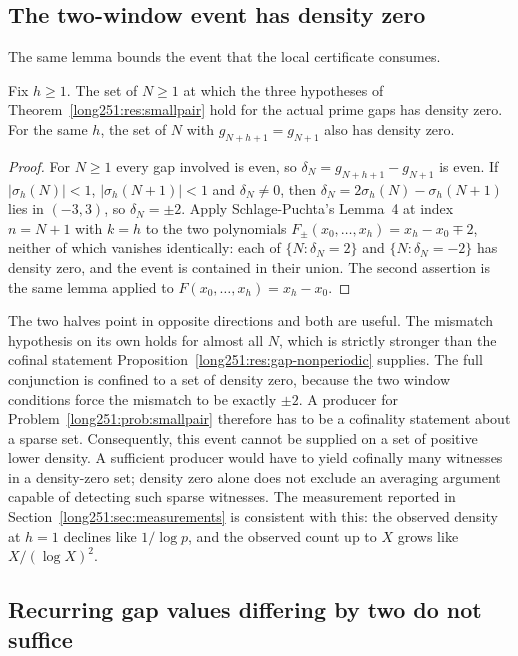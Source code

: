 \documentclass[11pt]{article}
\begin{document}
\subsection{The two-window event has density zero}

The same lemma bounds the event that the local certificate consumes.

\begin{theorem}\label{long251:res:sparse}
Fix $h\ge1$.  The set of $N\ge1$ at which the three hypotheses of
Theorem~\ref{long251:res:smallpair} hold for the actual prime gaps has density zero.
For the same $h$, the set of $N$ with $g_{N+h+1}=g_{N+1}$ also has density
zero.
\end{theorem}

\begin{proof}
For $N\ge1$ every gap involved is even, so $\delta_N=g_{N+h+1}-g_{N+1}$ is
even.  If $|\sigma_h(N)|<1$, $|\sigma_h(N+1)|<1$ and $\delta_N\ne0$, then
$\delta_N=2\sigma_h(N)-\sigma_h(N+1)$ lies in $(-3,3)$, so $\delta_N=\pm2$.
Apply Schlage-Puchta's Lemma~4 at index $n=N+1$ with $k=h$ to the two
polynomials $F_\pm(x_0,\ldots,x_h)=x_h-x_0\mp2$, neither of which vanishes
identically: each of $\{N:\delta_N=2\}$ and $\{N:\delta_N=-2\}$ has density
zero, and the event is contained in their union.  The second assertion is the
same lemma applied to $F(x_0,\ldots,x_h)=x_h-x_0$.
\end{proof}

The two halves point in opposite directions and both are useful.  The mismatch
hypothesis on its own holds for almost all $N$, which is strictly stronger than
the cofinal statement Proposition~\ref{long251:res:gap-nonperiodic} supplies.  The full
conjunction is confined to a set of density zero, because the two window
conditions force the mismatch to be exactly $\pm2$.  A producer for
Problem~\ref{long251:prob:smallpair} therefore has to be a cofinality statement about
a sparse set.  Consequently, this event cannot be supplied on a set of positive
lower density.  A sufficient producer would have to yield cofinally many
witnesses in a density-zero set; density zero alone does not exclude an
averaging argument capable of detecting such sparse witnesses.  The measurement reported
in Section~\ref{long251:sec:measurements} is consistent with this: the observed density
at $h=1$ declines like $1/\log p$, and the observed count up to $X$ grows like
$X/(\log X)^2$.

\subsection{Recurring gap values differing by two do not suffice}
\end{document}
